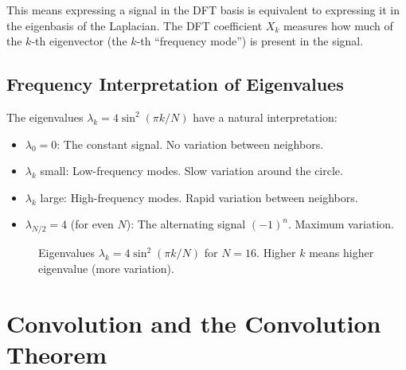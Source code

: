 \begin{notechapter}
This means expressing a signal in the DFT basis is equivalent to 
expressing it in the eigenbasis of the Laplacian. The DFT coefficient 
$X_k$ measures how much of the $k$-th eigenvector (the $k$-th 
``frequency mode'') is present in the signal.

\subsection{Frequency Interpretation of Eigenvalues}

The eigenvalues $\lambda_k = 4\sin^2(\pi k/N)$ have a natural 
interpretation:

\begin{itemize}
\item $\lambda_0 = 0$: The constant signal. No variation between 
      neighbors.
\item $\lambda_k$ small: Low-frequency modes. Slow variation around 
      the circle.
\item $\lambda_k$ large: High-frequency modes. Rapid variation between 
      neighbors.
\item $\lambda_{N/2} = 4$ (for even $N$): The alternating signal 
      $(-1)^n$. Maximum variation.
\end{itemize}

\begin{figure}[H]
\centering
{}
\caption{Eigenvalues $\lambda_k = 4\sin^2(\pi k/N)$ for $N=16$. Higher 
         $k$ means higher eigenvalue (more variation).}
\end{figure}

\section{Convolution and the Convolution Theorem}


\end{notechapter}

